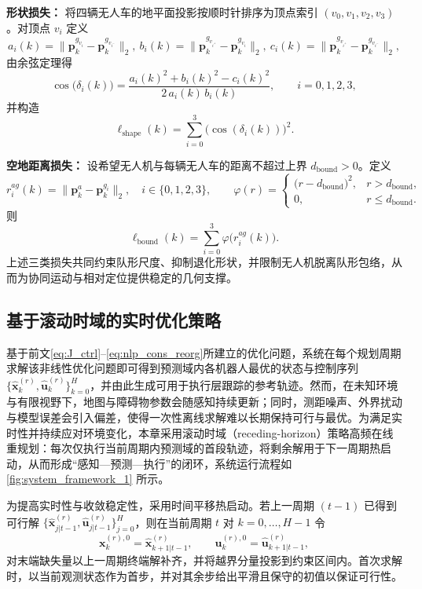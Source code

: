 \textbf{形状损失：} 将四辆无人车的地平面投影按顺时针排序为顶点索引 \((v_0,v_1,v_2,v_3)\)。对顶点 \(v_i\) 定义
\[
a_i(k)=\big\|\mathbf{p}^{g_{v_i}}_k-\mathbf{p}^{g_{v_{i^-}}}_k\big\|_2,\ 
b_i(k)=\big\|\mathbf{p}^{g_{v_{i^+}}}_k-\mathbf{p}^{g_{v_i}}_k\big\|_2,\ 
c_i(k)=\big\|\mathbf{p}^{g_{v_{i^+}}}_k-\mathbf{p}^{g_{v_{i^-}}}_k\big\|_2,
\]
由余弦定理得
\begin{equation}
\cos\big(\delta_i(k)\big)
=\frac{a_i(k)^2+b_i(k)^2-c_i(k)^2}{2\,a_i(k)\,b_i(k)},\qquad i=0,1,2,3,
\label{eq:cos_delta_k}
\end{equation}
并构造
\begin{equation}
\ell_{\mathrm{shape}}(k)=\sum_{i=0}^{3}\big(\cos(\delta_i(k))\big)^2.
\label{eq:l_shape_k}
\end{equation}

\textbf{空地距离损失：} 设希望无人机与每辆无人车的距离不超过上界 \(d_{\mathrm{bound}}>0\)。定义
\[
r^{ag}_i(k)=\big\|\mathbf{p}^a_k-\mathbf{p}^{g_i}_k\big\|_2,\quad i\in\{0,1,2,3\},
\qquad
\varphi(r)=
\begin{cases}
\big(r-d_{\mathrm{bound}}\big)^2, & r>d_{\mathrm{bound}},\\[2pt]
0, & r\le d_{\mathrm{bound}}.
\end{cases}
\]
则
\begin{equation}
\ell_{\mathrm{bound}}(k)=\sum_{i=0}^{3}\varphi\!\big(r^{ag}_i(k)\big).
\label{eq:l_bound_k}
\end{equation}
上述三类损失共同约束队形尺度、抑制退化形状，并限制无人机脱离队形包络，从而为协同运动与相对定位提供稳定的几何支撑。

\subsection{基于滚动时域的实时优化策略}

基于前文\autoref{eq:J_ctrl}--\autoref{eq:nlp_cons_reorg}所建立的优化问题，系统在每个规划周期求解该非线性优化问题即可得到预测域内各机器人最优的状态与控制序列
\(\{\widehat{\mathbf{x}}^{(r)}_{k},\widehat{\mathbf{u}}^{(r)}_{k}\}_{k=0}^{H}\)，并由此生成可用于执行层跟踪的参考轨迹。然而，在未知环境与有限视野下，地图与障碍物参数会随感知持续更新；同时，测距噪声、外界扰动与模型误差会引入偏差，使得一次性离线求解难以长期保持可行与最优。为满足实时性并持续应对环境变化，本章采用滚动时域（receding-horizon）策略高频在线重规划：每次仅执行当前周期内预测域的首段轨迹，将剩余解用于下一周期热启动，从而形成“感知—预测—执行”的闭环，系统运行流程如\autoref{fig:system_framework_1} 所示。

为提高实时性与收敛稳定性，采用时间平移热启动。若上一周期 \((t-1)\) 已得到可行解
\(\{\widehat{\mathbf{x}}^{(r)}_{j|t-1},\widehat{\mathbf{u}}^{(r)}_{j|t-1}\}_{j=0}^{H}\)，则在当前周期 \(t\) 对 \(k=0,\dots,H-1\) 令
\[
\mathbf{x}^{(r),0}_k=\widehat{\mathbf{x}}^{(r)}_{k+1|t-1},\qquad
\mathbf{u}^{(r),0}_k=\widehat{\mathbf{u}}^{(r)}_{k+1|t-1},
\]
对末端缺失量以上一周期终端解补齐，并将越界分量投影到约束区间内。首次求解时，以当前观测状态作为首步，并对其余步给出平滑且保守的初值以保证可行性。

